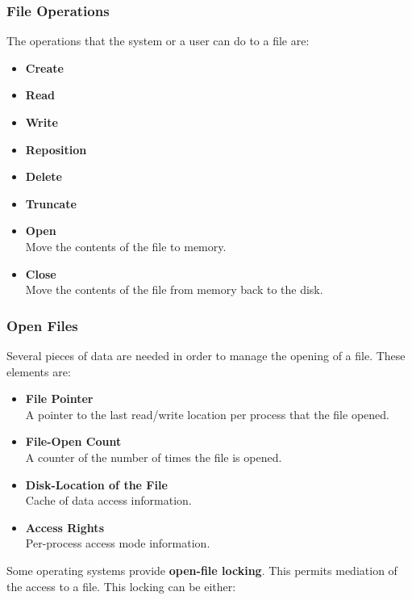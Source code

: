 \documentclass{article}
\begin{document}
\subsubsection{File Operations}
The operations that the system or a user can do to a file are:

\begin{itemize}
	\item \textbf{Create}
	
	\item \textbf{Read}
	
	\item \textbf{Write}
	
	\item \textbf{Reposition}
	
	\item \textbf{Delete}
	
	\item \textbf{Truncate}
	
	\item \textbf{Open}
	\vspace{.2cm} \\
	Move the contents of the file to memory.
	
	\item \textbf{Close}
	\vspace{.2cm} \\
	Move the contents of the file from memory back to the disk.
\end{itemize}

\subsubsection{Open Files}
Several pieces of data are needed in order to manage the opening of a file. These elements are:

\begin{itemize}
	\item \textbf{File Pointer}
	\vspace{.2cm} \\
	A pointer to the last read/write location per process that the file opened.
	
	\item \textbf{File-Open Count}
	\vspace{.2cm} \\
	A counter of the number of times the file is opened.
	
	\item \textbf{Disk-Location of the File}
	\vspace{.2cm} \\
	Cache of data access information.
	
	\item \textbf{Access Rights}
	\vspace{.2cm} \\
	Per-process access mode information.
\end{itemize}
Some operating systems provide \textbf{open-file locking}. This permits mediation of the access to a file. This locking can be either:
\end{document}
